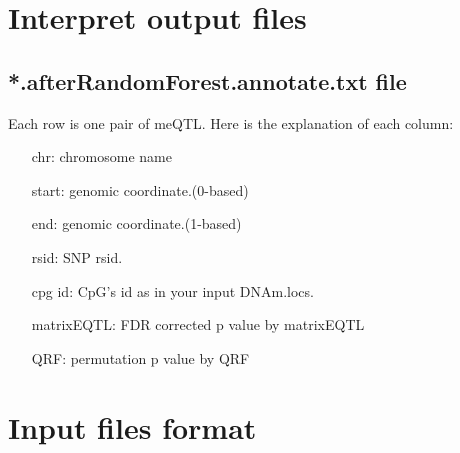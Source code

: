 \documentclass[12pt]{article}
\begin{document}
{\color{red}\section{Interpret output files}}

{\color{blue}\subsection{*.afterRandomForest.annotate.txt file }}
Each row is one pair of meQTL. Here is the explanation of each column:
\begin{enumerate}
\item[chr:] chromosome name
\item[start:] genomic coordinate.(0-based)
\item[end:] genomic coordinate.(1-based)
\item[rsid:] SNP rsid.
\item[cpg id:] CpG's id as in your input DNAm.locs.
\item[matrixEQTL:] FDR corrected p value by matrixEQTL
\item[QRF:] permutation p value by QRF

\end{enumerate}


{\color{red}\section{Input files format}}
\end{document}
